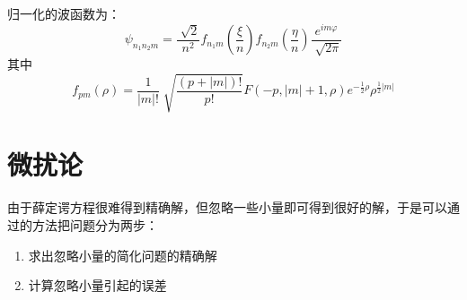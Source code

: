\documentclass[12pt, a4paper, oneside]{ctexbook}
\newcommand{\hl}[1]{\hlbox{#1}}
\newcounter{#2}
\newcounter{#2}[#1]
\numberwithin{#2}{#1}
\newcommand{\xkuo}[1]{\left(#1\right)}
\begin{document}
            \begin{deduce}
                归一化的波函数为：
                \begin{equation}
                    \psi_{n_1n_2m}=\frac{\sqrt[]{2}}{n^2}f_{n_1m}\xkuo{\frac{\xi}{n}}f_{n_2m}\xkuo{\frac{\eta}{n}}\frac{e^{im\varphi}}{\sqrt[]{2\pi}}
                \end{equation}
                其中
                \begin{equation}
                    f_{pm}(\rho)=\frac{1}{|m|!}\sqrt[]{\frac{(p+|m|)!}{p!}}F(-p,|m|+1,\rho)e^{-\frac12\rho}\rho^{\frac12|m|}
                \end{equation}
            \end{deduce}
            \chapter{微扰论}
            \begin{method}
              由于薛定谔方程很难得到精确解，但忽略一些小量即可得到很好的解，于是可以通过\hl{微扰论}的方法把问题分为两步：
              \begin{enumerate}
                \item 求出忽略小量的简化问题的精确解
                \item 计算忽略小量引起的误差
              \end{enumerate}
            \end{method}
\end{document}
